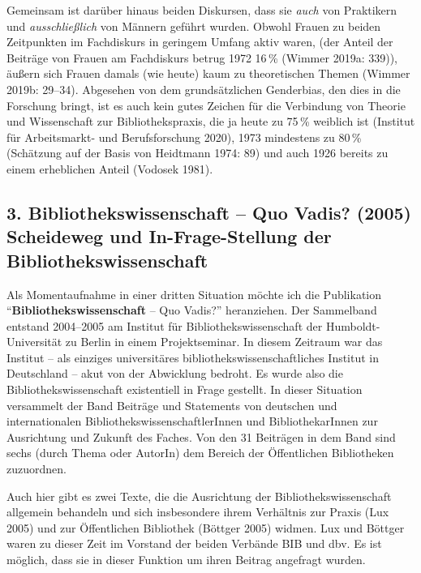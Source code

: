 \documentclass[a4paper,
fontsize=11pt,
oneside,
numbers=noperiodatend,
parskip=half-,
bibliography=totoc,
final
]{scrartcl}
\begin{document}
Gemeinsam ist darüber hinaus beiden Diskursen, dass sie \emph{auch} von
Praktikern und \emph{ausschließlich} von Männern geführt wurden. Obwohl
Frauen zu beiden Zeitpunkten im Fachdiskurs in geringem Umfang aktiv
waren, (der Anteil der Beiträge von Frauen am Fachdiskurs betrug 1972
16\,\% (Wimmer 2019a: 339)), äußern sich Frauen damals (wie heute) kaum
zu theoretischen Themen (Wimmer 2019b: 29--34). Abgesehen von dem
grundsätzlichen Genderbias, den dies in die Forschung bringt, ist es
auch kein gutes Zeichen für die Verbindung von Theorie und Wissenschaft
zur Bibliothekspraxis, die ja heute zu 75\,\% weiblich ist (Institut für
Arbeitsmarkt- und Berufsforschung 2020), 1973 mindestens zu 80\,\%
(Schätzung auf der Basis von Heidtmann 1974: 89) und auch 1926 bereits
zu einem erheblichen Anteil (Vodosek 1981).

\hypertarget{bibliothekswissenschaft-quo-vadis-2005-scheideweg-und-in-frage-stellung-der-bibliothekswissenschaft}{%
\subsection{3. Bibliothekswissenschaft -- Quo Vadis? (2005) Scheideweg
und In-Frage-Stellung der
Bibliothekswissenschaft}\label{bibliothekswissenschaft-quo-vadis-2005-scheideweg-und-in-frage-stellung-der-bibliothekswissenschaft}}

Als Momentaufnahme in einer dritten Situation möchte ich die Publikation
\enquote{\textbf{Bibliothekswissenschaft} -- Quo Vadis?} heranziehen.
Der Sammelband entstand 2004--2005 am Institut für
Bibliothekswissenschaft der Humboldt-Universität zu Berlin in einem
Projektseminar. In diesem Zeitraum war das Institut -- als einziges
universitäres bibliothekswissenschaftliches Institut in Deutschland --
akut von der Abwicklung bedroht. Es wurde also die
Bibliothekswissenschaft existentiell in Frage gestellt. In dieser
Situation versammelt der Band Beiträge und Statements von deutschen und
internationalen BibliothekswissenschaftlerInnen und BibliothekarInnen
zur Ausrichtung und Zukunft des Faches. Von den 31 Beiträgen in dem Band
sind sechs (durch Thema oder AutorIn) dem Bereich der Öffentlichen
Bibliotheken zuzuordnen.

Auch hier gibt es zwei Texte, die die Ausrichtung der
Bibliothekswissenschaft allgemein behandeln und sich insbesondere ihrem
Verhältnis zur Praxis (Lux 2005) und zur Öffentlichen Bibliothek
(Böttger 2005) widmen. Lux und Böttger waren zu dieser Zeit im Vorstand
der beiden Verbände BIB und dbv. Es ist möglich, dass sie in dieser
Funktion um ihren Beitrag angefragt wurden.
\end{document}
